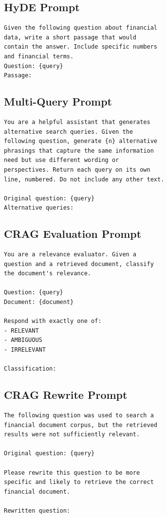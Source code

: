 \documentclass{article}
\begin{document}
\subsection{HyDE Prompt}
\begin{small}
\begin{verbatim}
Given the following question about financial
data, write a short passage that would
contain the answer. Include specific numbers
and financial terms.
Question: {query}
Passage:
\end{verbatim}
\end{small}

\subsection{Multi-Query Prompt}
\begin{small}
\begin{verbatim}
You are a helpful assistant that generates
alternative search queries. Given the
following question, generate {n} alternative
phrasings that capture the same information
need but use different wording or
perspectives. Return each query on its own
line, numbered. Do not include any other text.

Original question: {query}
Alternative queries:
\end{verbatim}
\end{small}

\subsection{CRAG Evaluation Prompt}
\begin{small}
\begin{verbatim}
You are a relevance evaluator. Given a
question and a retrieved document, classify
the document's relevance.

Question: {query}
Document: {document}

Respond with exactly one of:
- RELEVANT
- AMBIGUOUS
- IRRELEVANT

Classification:
\end{verbatim}
\end{small}

\subsection{CRAG Rewrite Prompt}
\begin{small}
\begin{verbatim}
The following question was used to search a
financial document corpus, but the retrieved
results were not sufficiently relevant.

Original question: {query}

Please rewrite this question to be more
specific and likely to retrieve the correct
financial document.

Rewritten question:
\end{verbatim}
\end{small}
\end{document}
